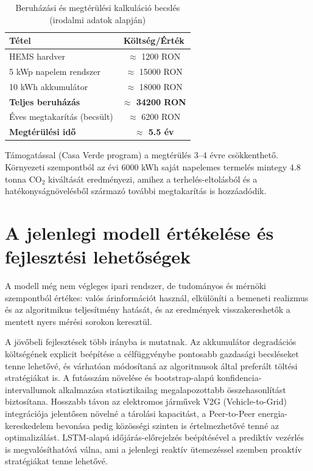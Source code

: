 \begin{table}[H]
\centering
\caption{Beruházási és megtérülési kalkuláció becslés (irodalmi adatok alapján)}
\begin{tabular}{lc}
\toprule
\textbf{Tétel} & \textbf{Költség/Érték} \\
\midrule
HEMS hardver & $\approx$ 1200 RON \\
5 kWp napelem rendszer & $\approx$ 15000 RON \\
10 kWh akkumulátor & $\approx$ 18000 RON \\
\midrule
\textbf{Teljes beruházás} & \textbf{$\approx$ 34200 RON} \\
\midrule
Éves megtakarítás (becsült) & $\approx$ 6200 RON \\
\midrule
\textbf{Megtérülési idő} & \textbf{$\approx$ 5.5 év} \\
\bottomrule
\end{tabular}
\end{table}

Támogatással (Casa Verde program) a megtérülés 3--4 évre csökkenthető. Környezeti szempontból az évi 6000 kWh saját napelemes termelés mintegy 4.8 tonna CO$_2$ kiváltását eredményezi, amihez a terhelés-eltolásból és a hatékonyságnövelésből származó további megtakarítás is hozzáadódik.

\section{A jelenlegi modell értékelése és fejlesztési lehetőségek}

A modell még nem végleges ipari rendszer, de tudományos és mérnöki szempontból értékes: valós árinformációt használ, elkülöníti a bemeneti realizmus és az algoritmikus teljesítmény hatását, és az eredmények visszakereshetők a mentett nyers mérési sorokon keresztül.

A jövőbeli fejlesztések több irányba is mutatnak. Az akkumulátor degradációs költségének explicit beépítése a célfüggvénybe pontosabb gazdasági becsléseket tenne lehetővé, és várhatóan módosítaná az algoritmusok által preferált töltési stratégiákat is. A futásszám növelése és bootstrap-alapú konfidencia-intervallumok alkalmazása statisztikailag megalapozottabb összehasonlítást biztosítana. Hosszabb távon az elektromos járművek V2G (Vehicle-to-Grid) integrációja jelentősen növelné a tárolási kapacitást, a Peer-to-Peer energia-kereskedelem bevonása pedig közösségi szinten is értelmezhetővé tenné az optimalizálást. LSTM-alapú időjárás-előrejelzés beépítésével a prediktív vezérlés is megvalósíthatóvá válna, ami a jelenlegi reaktív ütemezéssel szemben proaktív stratégiákat tenne lehetővé.
